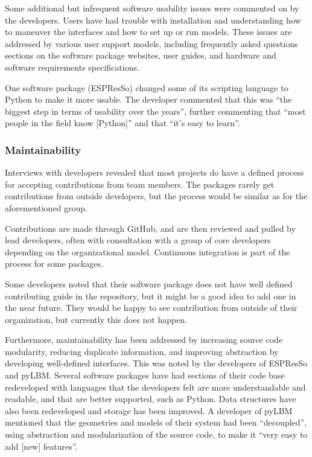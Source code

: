 \documentclass[12pt, notitlepage]{article}
\begin{document}
Some additional but infrequent software usability issues were commented on by the developers. Users have had trouble with installation and understanding how to maneuver the interfaces and how to set up or run models. These issues are addressed by various user support models, including frequently asked questions sections on the software package websites, user guides, and hardware and software requirements specifications.

One software package (ESPResSo) changed some of its scripting language to Python to make it more usable. The developer commented that this was ``the biggest step in terms of usability over the years'', further commenting that ``most people in the field know [Python]'' and that ``it's easy to learn''. 

\subsubsection{Maintainability}

Interviews with developers revealed that most projects do have a defined process for accepting contributions from team members. The packages rarely get contributions from outside developers, but the process would be similar as for the aforementioned group.

Contributions are made through GitHub, and are then reviewed and pulled by lead developers, often with consultation with a group of core developers depending on the organizational model. Continuous integration is part of the process for some packages. 

Some developers noted that their software package does not have well defined contributing guide in the repository, but it might be a good idea to add one in the near future. They would be happy to see contribution from outside of their organization, but currently this does not happen.

Furthermore, maintainability has been addressed by increasing source code modularity, reducing duplicate information, and improving abstraction by developing well-defined interfaces. This was noted by the developers of ESPResSo and pyLBM. Several software packages have had sections of their code base redeveloped with languages that the developers felt are more understandable and readable, and that are better supported, such as Python. Data structures have also been redeveloped and storage has been improved. A developer of pyLBM mentioned that the geometries and models of their system had been ``decoupled'', using abstraction and modularization of the source code, to make it ``very easy to add [new] features''.
\end{document}
